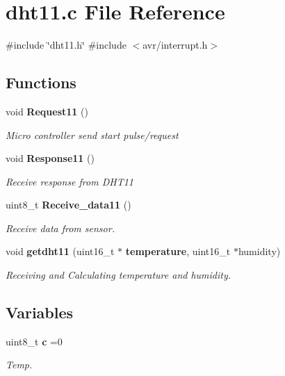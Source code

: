 \section{dht11.\+c File Reference}
\label{dht11_8c}
{\ttfamily \#include \char`\"{}dht11.\+h\char`\"{}}\newline
{\ttfamily \#include $<$avr/interrupt.\+h$>$}\newline
\subsection*{Functions}
\begin{DoxyCompactItemize}
\item 
void \textbf{ Request11} ()
\begin{DoxyCompactList}\small\item\em Micro controller send start pulse/request ~\newline
 \end{DoxyCompactList}\item 
void \textbf{ Response11} ()
\begin{DoxyCompactList}\small\item\em Receive response from D\+H\+T11 ~\newline
 \end{DoxyCompactList}\item 
uint8\+\_\+t \textbf{ Receive\+\_\+data11} ()
\begin{DoxyCompactList}\small\item\em Receive data from sensor. \end{DoxyCompactList}\item 
void \textbf{ getdht11} (uint16\+\_\+t $\ast$\textbf{ temperature}, uint16\+\_\+t $\ast$humidity)
\begin{DoxyCompactList}\small\item\em Receiving and Calculating temperature and humidity. \end{DoxyCompactList}\end{DoxyCompactItemize}
\subsection*{Variables}
\begin{DoxyCompactItemize}
\item 
uint8\+\_\+t \textbf{ c} =0
\begin{DoxyCompactList}\small\item\em Temp. \end{DoxyCompactList}\end{DoxyCompactItemize}


